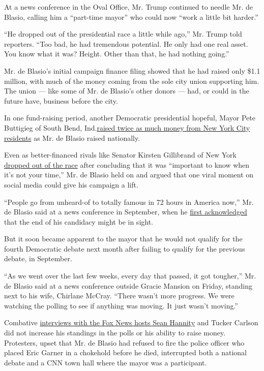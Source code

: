 At a news conference in the Oval Office, Mr. Trump continued to needle
Mr. de Blasio, calling him a ``part-time mayor'' who could now ``work a
little bit harder.''

``He dropped out of the presidential race a little while ago,'' Mr.
Trump told reporters. ``Too bad, he had tremendous potential. He only
had one real asset. You know what it was? Height. Other than that, he
had nothing going.''

Mr. de Blasio's initial campaign finance filing showed that he had
raised only \$1.1 million, with much of the money coming from the sole
city union supporting him. The union --- like some of Mr. de Blasio's
other donors --- had, or could in the future have, business before the
city.

In one fund-raising period, another Democratic presidential hopeful,
Mayor Pete Buttigieg of South Bend,
Ind.\href{https://www.nytimes3xbfgragh.onion/2019/03/25/nyregion/pete-buttigieg-2020-de-blasio-mayor.html}{raised
twice as much money from New York City residents} as Mr. de Blasio
raised nationally.

Even as better-financed rivals like Senator Kirsten Gillibrand of New
York
\href{https://www.nytimes3xbfgragh.onion/aponline/2019/08/28/us/politics/ap-us-election-2020-gillibrand.html}{dropped
out of the race} after concluding that it was ``important to know when
it's not your time,'' Mr. de Blasio held on and argued that one viral
moment on social media could give his campaign a lift.

``People go from unheard-of to totally famous in 72 hours in America
now,'' Mr. de Blasio said at a news conference in September, when he
\href{https://www.nytimes3xbfgragh.onion/2019/09/04/nyregion/de-blasio-2020-president.html}{first
acknowledged} that the end of his candidacy might be in sight.

But it soon became apparent to the mayor that he would not qualify for
the fourth Democratic debate next month after failing to qualify for the
previous debate, in September.

``As we went over the last few weeks, every day that passed, it got
tougher,'' Mr. de Blasio said at a news conference outside Gracie
Mansion on Friday, standing next to his wife, Chirlane McCray. ``There
wasn't more progress. We were watching the polling to see if anything
was moving. It just wasn't moving.''

Combative
\href{https://www.nytimes3xbfgragh.onion/2019/08/08/nyregion/de-blasio-sean-hannity-fox-news.html?rref=collection\%2Fbyline\%2Fjeffery-c.-mays\&action=click\&contentCollection=undefined\&region=stream\&module=stream_unit\&version=latest\&contentPlacement=7\&pgtype=collection}{interviews
with the Fox News hosts Sean Hannity} and Tucker Carlson did not
increase his standings in the polls or his ability to raise money.
Protesters, upset that Mr. de Blasio had refused to fire the police
officer who placed Eric Garner in a chokehold before he died,
interrupted both a national debate and a CNN town hall where the mayor
was a participant.

